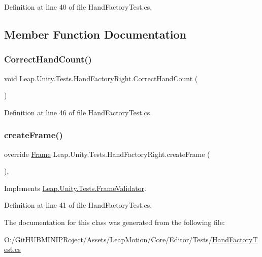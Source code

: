 Definition at line 40 of file Hand\+Factory\+Test.\+cs.



\subsection{Member Function Documentation}
\mbox{\label{class_leap_1_1_unity_1_1_tests_1_1_hand_factory_right_a96faa3acb560751fb8c44712666b111a}} 
\subsubsection{\texorpdfstring{CorrectHandCount()}{CorrectHandCount()}}
{\footnotesize\ttfamily void Leap.\+Unity.\+Tests.\+Hand\+Factory\+Right.\+Correct\+Hand\+Count (\begin{DoxyParamCaption}{ }\end{DoxyParamCaption})}



Definition at line 46 of file Hand\+Factory\+Test.\+cs.

\mbox{\label{class_leap_1_1_unity_1_1_tests_1_1_hand_factory_right_a78c8a9a73c6c7e18c0eb8890e39d64b5}} 
\subsubsection{\texorpdfstring{createFrame()}{createFrame()}}
{\footnotesize\ttfamily override \mbox{\hyperlink{class_leap_1_1_frame}{Frame}} Leap.\+Unity.\+Tests.\+Hand\+Factory\+Right.\+create\+Frame (\begin{DoxyParamCaption}{ }\end{DoxyParamCaption})\hspace{0.3cm}{\ttfamily [protected]}, {\ttfamily [virtual]}}



Implements \mbox{\hyperlink{class_leap_1_1_unity_1_1_tests_1_1_frame_validator_ae397067480c6fd2183160f048094e466}{Leap.\+Unity.\+Tests.\+Frame\+Validator}}.



Definition at line 41 of file Hand\+Factory\+Test.\+cs.



The documentation for this class was generated from the following file\+:\begin{DoxyCompactItemize}
\item 
O\+:/\+Git\+H\+U\+B\+M\+I\+N\+I\+P\+Roject/\+Assets/\+Leap\+Motion/\+Core/\+Editor/\+Tests/\mbox{\hyperlink{_hand_factory_test_8cs}{Hand\+Factory\+Test.\+cs}}\end{DoxyCompactItemize}
